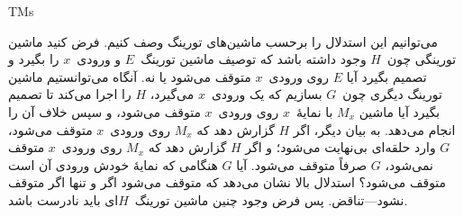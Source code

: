\documentclass[../../../include/open-logic-section]{subfiles}
\begin{document}
\begin{tagblock}{TMs}
\begin{explain}
می‌توانیم این استدلال را برحسب ماشین‌های تورینگ وصف کنیم. فرض کنید
ماشین تورینگی چون~$H$ وجود داشته باشد که توصیف ماشین تورینگ~$E$ و
ورودی~$x$ را بگیرد و تصمیم بگیرد آیا $E$ روی ورودی~$x$ متوقف می‌شود
یا نه. آنگاه می‌توانستیم ماشین تورینگ دیگری چون~$G$ بسازیم که یک
ورودی~$x$ می‌گیرد، $H$ را اجرا می‌کند تا تصمیم بگیرد آیا ماشین
$M_x$ با نمایهٔ~$x$ روی ورودی~$x$ متوقف می‌شود، و سپس خلاف آن را
انجام می‌دهد. به بیان دیگر، اگر $H$ گزارش دهد که $M_x$ روی ورودی~$x$
متوقف می‌شود، $G$ وارد حلقه‌ای بی‌نهایت می‌شود؛ و اگر $H$ گزارش دهد
که $M_x$ روی ورودی~$x$ متوقف نمی‌شود، $G$ صرفاً متوقف می‌شود. آیا
$G$ هنگامی که نمایهٔ خودش ورودی آن است متوقف می‌شود؟ استدلال بالا
نشان می‌دهد که متوقف می‌شود اگر و تنها اگر متوقف نشود---تناقض. پس
فرض وجود چنین ماشین تورینگ~$H$ای باید نادرست باشد.
\end{explain}
\end{tagblock}
\end{document}
